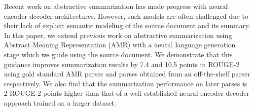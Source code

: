 Recent work on abstractive summarization has made progress with neural encoder-decoder architectures. However, such models are often challenged due to their lack of explicit semantic modeling of the source document and its summary. In this paper, we extend previous work on abstractive summarization using Abstract Meaning Representation (AMR) with a neural language generation stage which we guide using the source document. We demonstrate that this guidance improves summarization results by 7.4 and 10.5 points in ROUGE-2 using gold standard AMR parses and parses obtained from an off-the-shelf parser respectively. We also find that the summarization performance on later parses is 2 ROUGE-2 points higher than that of a well-established neural encoder-decoder approach trained on a larger dataset.
